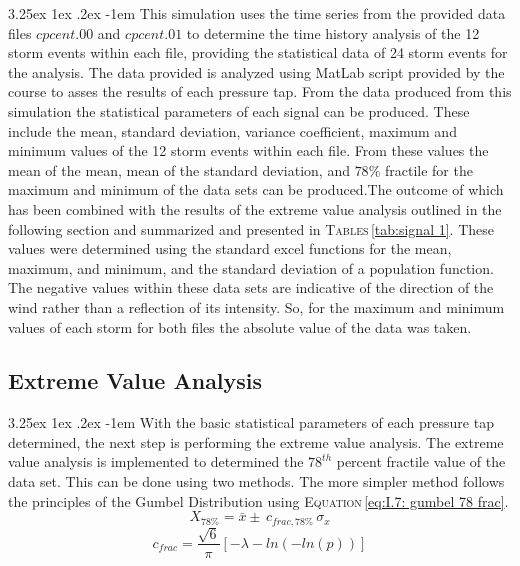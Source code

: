\documentclass[11pt,a4paper,titlepage]{report}
\makeatletter
\renewcommand\paragraph{\@startsection{paragraph}{5}{\z@}%
  {3.25ex \@plus1ex \@minus.2ex}%
  {-1em}%
  {\normalfont\normalsize\bfseries}}
\makeatother
\begin{document}
\paragraph{}This simulation uses the time series from the provided data files $cpcent.00$ and $cpcent.01$ to determine the time history analysis of the 12 storm events within each file, providing the statistical data of 24 storm events for the analysis. The data provided is analyzed using MatLab script provided by the course to asses the results of each pressure tap. From the data produced from this simulation the statistical parameters of each signal can be produced. These include the mean, standard deviation, variance coefficient, maximum and minimum values of the 12 storm events within each file. From these values the mean of the mean, mean of the standard deviation, and $78\%$ fractile for the maximum and minimum of the data sets can be produced.The outcome of which has been combined with the results of the extreme value analysis outlined in the following section and summarized and presented in \textsc{Tables}\,\ref{tab:signal 1}. These values were determined using the standard excel functions for the mean, maximum, and minimum, and the standard deviation of a population function. The negative values within these data sets are indicative of the direction of the wind rather than a reflection of its intensity. So, for the maximum and minimum values of each storm for both files the absolute value of the data was taken. 
\subsection{Extreme Value Analysis}
\paragraph{}With the basic statistical parameters of each pressure tap determined, the next step is performing the extreme value analysis. The extreme value analysis is implemented to determined the $78^{th}$ percent fractile value of the data set. This can be done using two methods. The more simpler method follows the principles of the Gumbel Distribution using \textsc{Equation}\,\eqref{eq:I.7: gumbel 78 frac}. 
\begin{equation}
    X_{78\%}=\bar{x}\pm\,c_{frac,78\%}\,\sigma_x
    \label{eq:I.7: gumbel 78 frac}
\end{equation}
\begin{equation}
    c_{frac}=\dfrac{\sqrt{6}}{\pi}\left[-\lambda-ln(-ln(p))\right]
\end{equation}
\end{document}
